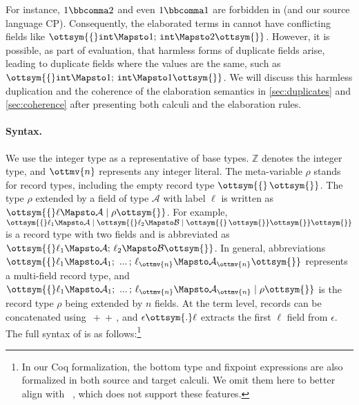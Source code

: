 For instance, $1  \bbcomma  2$ and even $1  \bbcomma  1$ are forbidden in \lambdaiplus (and
our source language CP). Consequently, the elaborated terms in \lambdar cannot
have conflicting fields like $\ottsym{\{}   \mathtt{int}   \Mapsto  1  ; \,   \mathtt{int}   \Mapsto  2  \ottsym{\}}$. However, it is possible,
as part of evaluation, that harmless forms of duplicate fields arise, leading to
duplicate fields where the values are the same, such as $\ottsym{\{}   \mathtt{int}   \Mapsto  1  ; \,   \mathtt{int}   \Mapsto  1  \ottsym{\}}$.
We will discuss this harmless duplication and the coherence of the elaboration
semantics in \autoref{sec:duplicates} and \autoref{sec:coherence} after
presenting both calculi and the elaboration rules.

\paragraph{Syntax.}
We use the integer type as a representative of base types. $ \mathbb{Z} $ denotes
the integer type, and $\ottmv{n}$ represents any integer literal. The meta-variable
$\rho$ stands for record types, including the empty record type $\ottsym{\{}  \,  \ottsym{\}}$. The
type $\rho$ extended by a field of type $\mathcal{A}$ with label $\ell$ is written
as $\ottsym{\{}  \ell  \Mapsto  \mathcal{A}  \mid  \rho  \ottsym{\}}$. For example, $\ottsym{\{}  \ell_{{\mathrm{1}}}  \Mapsto  \mathcal{A}  \mid  \ottsym{\{}  \ell_{{\mathrm{2}}}  \Mapsto  \mathcal{B}  \mid  \ottsym{\{}  \,  \ottsym{\}}  \ottsym{\}}  \ottsym{\}}$ is a
record type with two fields and is abbreviated as $\ottsym{\{}  \ell_{{\mathrm{1}}}  \Mapsto  \mathcal{A}  ; \,  \ell_{{\mathrm{2}}}  \Mapsto  \mathcal{B}  \ottsym{\}}$.
In general, abbreviations $\ottsym{\{}  \ell_{{\mathrm{1}}}  \Mapsto  \mathcal{A}_{{\mathrm{1}}}  ; \, \, ... \, ; \,  \ell_{\ottmv{n}}  \Mapsto  \mathcal{A}_{\ottmv{n}}  \ottsym{\}}$ represents a
multi-field record type, and $\ottsym{\{}  \ell_{{\mathrm{1}}}  \Mapsto  \mathcal{A}_{{\mathrm{1}}}  ; \, \, ... \, ; \,  \ell_{\ottmv{n}}  \Mapsto  \mathcal{A}_{\ottmv{n}}  \mid  \rho  \ottsym{\}}$ is
the record type $\rho$ being extended by $n$ fields. At the term level, records
can be concatenated using $ \,{+}\!{+}\, $, and $\epsilon  \ottsym{.}  \ell$ extracts the first $\ell$
field from $\epsilon$. The full syntax of \lambdar is as follows:\footnote{In our
Coq formalization, the bottom type and fixpoint expressions are also formalized
in both source and target calculi. We omit them here to better align with
\lambdaiplus~\citep{bi2018essence}, which does not support these features.}

